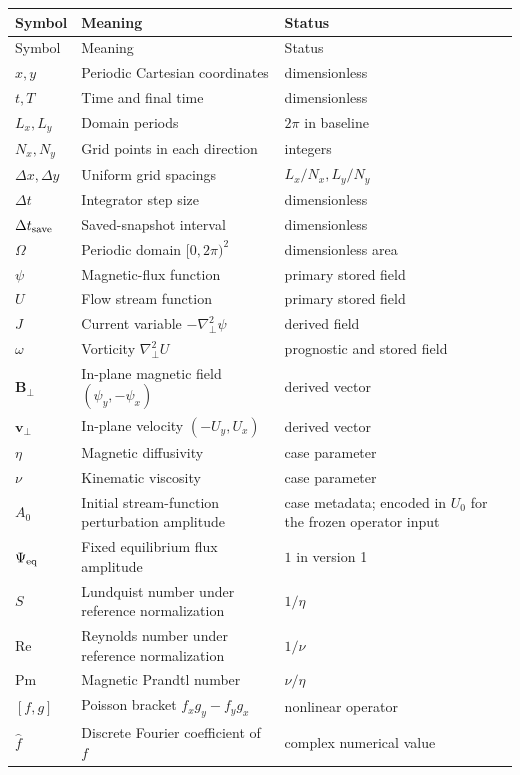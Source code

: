 \documentclass[11pt]{article}
\newcommand{\vect}[1]{\bm{#1}}
\newcommand{\Lap}{\nabla_{\!\perp}^{2}}
\begin{document}
\small
\begin{longtable}{p{}p{}p{}}
\toprule
Symbol & Meaning & Status \\
\midrule
\endfirsthead
\toprule
Symbol & Meaning & Status \\
\midrule
\endhead
$x,y$ & Periodic Cartesian coordinates & dimensionless \\
$t,T$ & Time and final time & dimensionless \\
$L_x,L_y$ & Domain periods & $2\pi$ in baseline \\
$N_x,N_y$ & Grid points in each direction & integers \\
$\Delta x,\Delta y$ & Uniform grid spacings & $L_x/N_x,L_y/N_y$ \\
$\Delta t$ & Integrator step size & dimensionless \\
$\Delta t_{\rm save}$ & Saved-snapshot interval & dimensionless \\
$\Omega$ & Periodic domain $[0,2\pi)^2$ & dimensionless area \\
$\psi$ & Magnetic-flux function & primary stored field \\
$U$ & Flow stream function & primary stored field \\
$J$ & Current variable $-\Lap\psi$ & derived field \\
$\omega$ & Vorticity $\Lap U$ & prognostic and stored field \\
$\vect{B}_\perp$ & In-plane magnetic field $(\psi_y,-\psi_x)$ & derived vector \\
$\vect{v}_\perp$ & In-plane velocity $(-U_y,U_x)$ & derived vector \\
$\eta$ & Magnetic diffusivity & case parameter \\
$\nu$ & Kinematic viscosity & case parameter \\
$A_0$ & Initial stream-function perturbation amplitude & case metadata; encoded in $U_0$ for the frozen operator input \\
$\Psi_{\rm eq}$ & Fixed equilibrium flux amplitude & $1$ in version 1 \\
$S$ & Lundquist number under reference normalization & $1/\eta$ \\
$\mathrm{Re}$ & Reynolds number under reference normalization & $1/\nu$ \\
$\mathrm{Pm}$ & Magnetic Prandtl number & $\nu/\eta$ \\
$[f,g]$ & Poisson bracket $f_xg_y-f_yg_x$ & nonlinear operator \\
$\widehat f$ & Discrete Fourier coefficient of $f$ & complex numerical value \\

\end{longtable}
\end{document}
